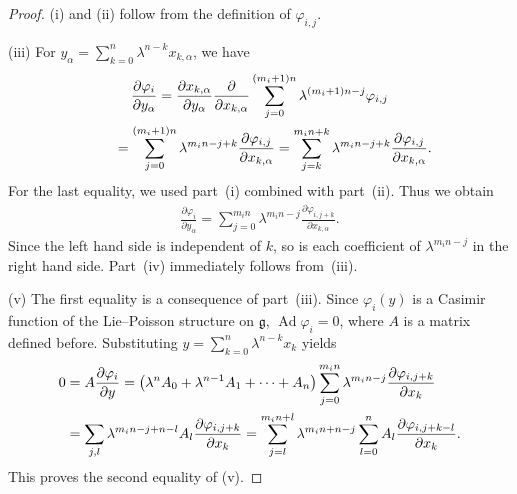 \documentclass[pdftex]{sigma}
\numberwithin{equation}{section}
\begin{document}
\begin{proof}
(i) and (ii) follow from the def\/inition of $\varphi _{i,j}$.

(iii) For $y_\alpha = \sum\limits^n_{k=0}\lambda ^{n-k}x_{k,\alpha }$, we have
\begin{gather*}
\frac{\partial \varphi _i}{\partial y_\alpha }= \frac{\partial x_{k,\alpha }}{\partial y_\alpha }\frac{\partial }{\partial x_{k,\alpha }}
 \sum^{(m_i+1)n}_{j=0}\lambda ^{(m_i+1)n-j}\varphi _{i,j} \\
\hphantom{\frac{\partial \varphi _i}{\partial y_\alpha }}{}
= \sum^{(m_i+1)n}_{j=0} \lambda ^{m_in-j+k}\frac{\partial \varphi _{i,j}}{\partial x_{k,\alpha }}
= \sum^{m_in + k}_{j=k} \lambda ^{m_in-j+k}\frac{\partial \varphi _{i,j}}{\partial x_{k,\alpha }}.
\end{gather*}
For the last equality, we used part~(i) combined with part~(ii). Thus we obtain
\begin{gather*}
\frac{\partial \varphi _i}{\partial y_\alpha } = \sum^{m_in}_{j=0} \lambda ^{m_in-j}\frac{\partial \varphi _{i,j+k}}{\partial x_{k,\alpha }}.
\end{gather*}
Since the left hand side is independent of $k$, so is each coef\/f\/icient of $\lambda ^{m_in-j}$ in the right hand side. Part~(iv) immediately follows from~(iii).

(v) The f\/irst equality is a consequence of part~(iii). Since $\varphi _i(y)$ is a Casimir function of the Lie--Poisson structure on $\mathfrak{g}$,
$\operatorname{Ad}\varphi _i =0$, where $A$ is a matrix def\/ined before. Substituting $y = \sum\limits^n_{k=0}\lambda ^{n-k}x_k$ yields{\samepage
\begin{gather*}
\begin{split}
& 0= A \frac{\partial \varphi _i}{\partial y}
= \big(\lambda ^nA_0 + \lambda ^{n-1}A_1 + \dots + A_n\big) \sum^{m_in}_{j=0} \lambda ^{m_in-j}\frac{\partial \varphi _{i,j+k}}{\partial x_{k}} \\
& \hphantom{0}{} = \sum_{j,l} \lambda ^{m_in-j+n-l}A_l \frac{\partial \varphi _{i,j+k}}{\partial x_{k}}
= \sum^{m_in+l}_{j=l} \lambda ^{m_in+n-j} \sum^n_{l=0} A_l\frac{\partial \varphi _{i,j+k-l}}{\partial x_{k}}.
\end{split}
\end{gather*}
This proves the second equality of (v).}


\end{proof}
\end{document}
